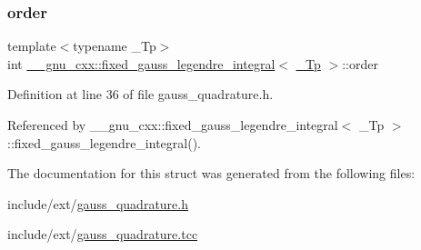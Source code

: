 \subsubsection{\texorpdfstring{order}{order}}
{\footnotesize\ttfamily template$<$typename \+\_\+\+Tp$>$ \\
int \hyperlink{struct____gnu__cxx_1_1fixed__gauss__legendre__integral}{\+\_\+\+\_\+gnu\+\_\+cxx\+::fixed\+\_\+gauss\+\_\+legendre\+\_\+integral}$<$ \hyperlink{namespace____gnu__cxx_a3b19a9c800ca194374ef9172290f7d79}{\+\_\+\+Tp} $>$\+::order}



Definition at line 36 of file gauss\+\_\+quadrature.\+h.



Referenced by \+\_\+\+\_\+gnu\+\_\+cxx\+::fixed\+\_\+gauss\+\_\+legendre\+\_\+integral$<$ \+\_\+\+Tp $>$\+::fixed\+\_\+gauss\+\_\+legendre\+\_\+integral().



The documentation for this struct was generated from the following files\+:\begin{DoxyCompactItemize}
\item 
include/ext/\hyperlink{gauss__quadrature_8h}{gauss\+\_\+quadrature.\+h}\item 
include/ext/\hyperlink{gauss__quadrature_8tcc}{gauss\+\_\+quadrature.\+tcc}\end{DoxyCompactItemize}
